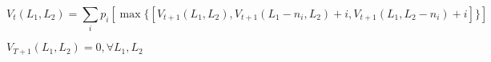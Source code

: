 $$V_{t}(L_1, L_2) = \sum_{i} p_i [\max \{ {[V_{t+1}(L_1, L_2), V_{t+1}(L_1- n_i, L_2)+ i, V_{t+1}(L_1, L_2 - n_i)+i]}\}]$$

$V_{T+1}(L_1, L_2) = 0, \forall L_1, L_2$
















